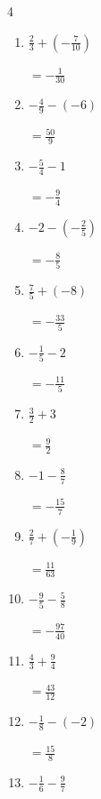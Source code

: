 \begin{multicols}{4}
\begin{enumerate}
  \item $\displaystyle \frac{2}{3} + \left(-\frac{7}{10}\right)$

        $\displaystyle =-\frac{1}{30}$

  \item $\displaystyle -\frac{4}{9} - \left(-6\right)$

        $\displaystyle =\frac{50}{9}$

  \item $\displaystyle -\frac{5}{4} - 1$

        $\displaystyle =-\frac{9}{4}$

  \item $\displaystyle -2 - \left(-\frac{2}{5}\right)$

        $\displaystyle =-\frac{8}{5}$

  \item $\displaystyle \frac{7}{5} + \left(-8\right)$

        $\displaystyle =-\frac{33}{5}$

\columnbreak %

  \item $\displaystyle -\frac{1}{5} - 2$

        $\displaystyle =-\frac{11}{5}$

  \item $\displaystyle \frac{3}{2} + 3$

        $\displaystyle =\frac{9}{2}$

  \item $\displaystyle -1 - \frac{8}{7}$

        $\displaystyle =-\frac{15}{7}$

  \item $\displaystyle \frac{2}{7} + \left(-\frac{1}{9}\right)$

        $\displaystyle =\frac{11}{63}$

  \item $\displaystyle -\frac{9}{5} - \frac{5}{8}$

        $\displaystyle =-\frac{97}{40}$

  \item $\displaystyle \frac{4}{3} + \frac{9}{4}$

        $\displaystyle =\frac{43}{12}$

  \item $\displaystyle -\frac{1}{8} - \left(-2\right)$

        $\displaystyle =\frac{15}{8}$

  \item $\displaystyle -\frac{1}{6} - \frac{9}{7}$


\end{enumerate}
\end{multicols}
